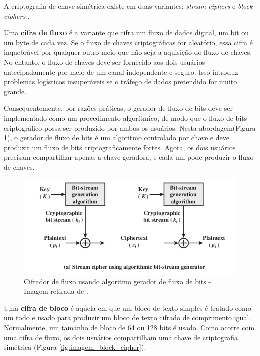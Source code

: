             A criptografia de chave simétrica existe em duas variantes: \textit{stream ciphers} e \textit{block ciphers} \cite{beginnig_blockchain_bikramaditya}.
            
            Uma \textbf{cifra de fluxo} é a variante que cifra um fluxo de dados digital, um bit ou um byte de cada vez. Se o fluxo de chaves criptográficas for aleatório, essa cifra é inquebrável por qualquer outro meio que não seja a aquisição do fluxo de chaves. No entanto, o fluxo de chaves deve ser fornecido aos dois usuários antecipadamente por meio de um canal independente e seguro. Isso introduz problemas logísticos insuperáveis se o tráfego de dados pretendido for muito grande.\cite{cryptograpy_and_network_stallings}
            
            Consequentemente, por razões práticas, o gerador de fluxo de bits deve ser implementado como um procedimento algorítmico, de modo que o fluxo de bits criptográfico possa ser produzido por ambos os usuários. Nesta abordagem(Figura \ref{fig:imagem_stream_cipher}), o gerador de fluxo de bits é um algoritmo controlado por chave e deve produzir um fluxo de bits criptograficamente fortes. Agora, os dois usuários precisam compartilhar apenas a chave geradora, e cada um pode produzir o fluxo de chaves.\cite{cryptograpy_and_network_stallings}
        
            
                \begin{figure}[H]
                     \centering
                     \includegraphics[scale=0.7]{figuras/capitulo_2/stream_cipher_generator.png}
                     \caption{Cifrador de fluxo usando algoritmo gerador de fluxo de bits - Imagem retirada de \cite{cryptograpy_and_network_stallings}.}
                     \label{fig:imagem_stream_cipher}
                \end{figure}
        
            Uma \textbf{cifra de bloco} é aquela em que um bloco de texto simples é tratado como um todo e usado para produzir um bloco de texto cifrado de comprimento igual. Normalmente, um tamanho de bloco de 64 ou 128 bits é usado. Como ocorre com uma cifra de fluxo, os dois usuários compartilham uma chave de criptografia simétrica (Figura \ref{fig:imagem_block_cipher}).


